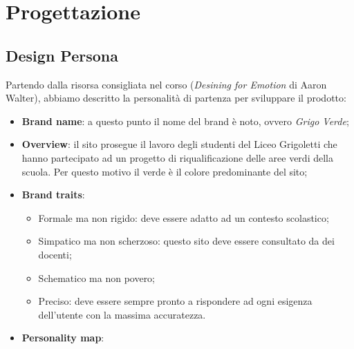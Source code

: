 \section{Progettazione}

\subsection{Design Persona}

Partendo dalla risorsa consigliata nel corso (\textit{Desining for Emotion} di
Aaron Walter), abbiamo descritto la personalità di partenza per sviluppare il
prodotto:

\begin{itemize}
	\item \textbf{Brand name}: a questo punto il nome del brand è noto, ovvero
	      \textit{Grigo Verde};

	\item \textbf{Overview}: il sito prosegue il lavoro degli studenti del Liceo
	      Grigoletti che hanno partecipato ad un progetto di riqualificazione
	      delle aree verdi della scuola. Per questo motivo il verde è il colore
	      predominante del sito;

	\item \textbf{Brand traits}:
	      \begin{itemize}
		      \item Formale ma non rigido: deve essere adatto ad un contesto
		            scolastico;
		      \item Simpatico ma non scherzoso: questo sito deve essere
		            consultato da dei docenti;
		      \item Schematico ma non povero;
		      \item Preciso: deve essere sempre pronto a rispondere ad ogni
		            esigenza dell'utente con la massima accuratezza.
	      \end{itemize}

	\item \textbf{Personality map}:
	      \begin{center}
\end{center}
\end{itemize}
